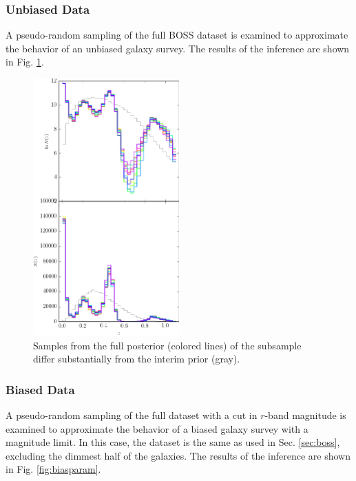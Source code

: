 \documentclass[preprint]{aastex}
\begin{document}
\clearpage
\subsubsection{Unbiased Data}
\label{sec:unbiased}

A pseudo-random sampling of the full BOSS dataset is examined to approximate 
the behavior of an unbiased galaxy survey.  The results of the inference are 
shown in Fig. \ref{fig:dataparam}.

\begin{figure}
\includegraphics[width=0.5\textwidth]{figs/boss/samps.png}
\caption{Samples from the full posterior (colored lines) of the subsample 
differ substantially from the interim prior (gray).}
\label{fig:dataparam}
\end{figure}

\clearpage
\subsubsection{Biased Data}
\label{sec:biased}

A pseudo-random sampling of the full dataset with a cut in $r$-band magnitude 
is examined to approximate the behavior of a biased galaxy survey with a 
magnitude limit.  In this case, the dataset is the same as used in Sec. 
\ref{sec:boss}, excluding the dimmest half of the galaxies.  The results of the 
inference are shown in Fig. \ref{fig:biasparam}.
\end{document}
